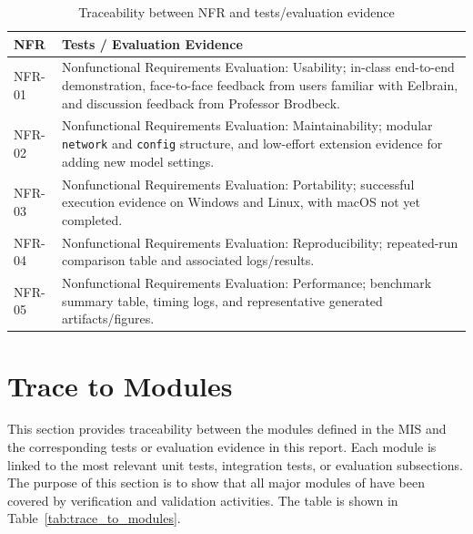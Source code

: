 \documentclass[12pt, titlepage]{article}
\begin{document}
\begin{table}[H]
\centering
\caption{Traceability between NFR and tests/evaluation evidence}
\label{tab:trace_to_requirements2}
\begin{tabularx}{0.96\textwidth}{p{2.0cm}X}
\toprule
\textbf{NFR} & \textbf{Tests / Evaluation Evidence} \\
\midrule


NFR-01 & Nonfunctional Requirements Evaluation: Usability; in-class end-to-end demonstration, face-to-face feedback from users familiar with Eelbrain, and discussion feedback from Professor Brodbeck. \\

NFR-02 & Nonfunctional Requirements Evaluation: Maintainability; modular \texttt{network} and \texttt{config} structure, and low-effort extension evidence for adding new model settings. \\

NFR-03 & Nonfunctional Requirements Evaluation: Portability; successful execution evidence on Windows and Linux, with macOS not yet completed. \\

NFR-04 & Nonfunctional Requirements Evaluation: Reproducibility; repeated-run comparison table and associated logs/results. \\

NFR-05 & Nonfunctional Requirements Evaluation: Performance; benchmark summary table, timing logs, and representative generated artifacts/figures. \\

\bottomrule
\end{tabularx}
\end{table}



		
\section{Trace to Modules}

This section provides traceability between the modules defined in the MIS and the corresponding tests or evaluation evidence in this report.
Each module is linked to the most relevant unit tests, integration tests, or evaluation subsections.
The purpose of this section is to show that all major modules of \progname{} have been covered by verification and validation activities.
The table is shown in Table~\ref{tab:trace_to_modules}.
\end{document}
